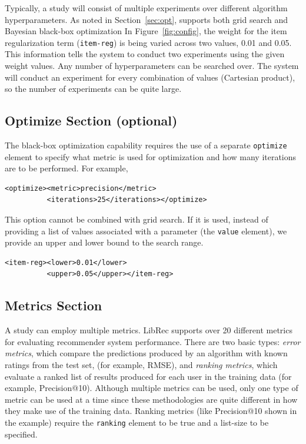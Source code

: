 Typically, a study will consist of multiple experiments over different algorithm hyperparameters. As noted in Section~\ref{sec:opt}, \libauto{} supports both grid search and Bayesian black-box optimization In Figure~\ref{fig:config}, the weight for the item regularization term (\texttt{item-reg}) is being varied across two values, 0.01 and 0.05. This information tells the system to conduct two experiments using the given weight values. Any number of hyperparameters can be searched over. The system will conduct an experiment for every combination of values (Cartesian product), so the number of experiments can be quite large.

\subsection{Optimize Section (optional)}
The black-box optimization capability requires the use of a separate \texttt{optimize} element to specify what metric is used for optimization and how many iterations are to be performed. For example,

{\small
\begin{verbatim}
<optimize><metric>precision</metric>
          <iterations>25</iterations></optimize>
\end{verbatim}}

This option cannot be combined with grid search. If it is used, instead of providing a list of values associated with a parameter (the \texttt{value} element), we provide an upper and lower bound to the search range.

{\small
\begin{verbatim}
<item-reg><lower>0.01</lower>
          <upper>0.05</upper></item-reg>
\end{verbatim}}

\subsection{Metrics Section}
A study can employ multiple metrics. LibRec supports over 20 different metrics for evaluating recommender system performance. There are two basic types: \textit{error metrics}, which compare the predictions produced by an algorithm with known ratings from the test set, (for example, RMSE), and \textit{ranking metrics}, which evaluate a ranked list of results produced for each user in the training data (for example, Precision@10). Although multiple metrics can be used, only one type of metric can be used at a time since these methodologies are quite different in how they make use of the training data. Ranking metrics (like Precision@10 shown in the example) require the \texttt{ranking} element to be true and a list-size to be specified.

